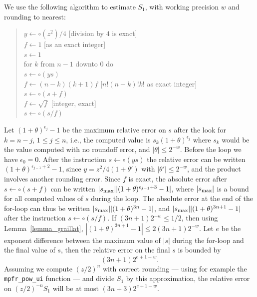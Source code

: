 \documentclass[12pt]{amsart}
\def\q{\hspace*{5mm}}
\begin{document}
We use the following algorithm to estimate $S_1$, with working precision $w$
and rounding to nearest:
\begin{quote}
$y \leftarrow \circ(z^2)/4$ [division by $4$ is exact] \\
$f \leftarrow 1$ [as an exact integer] \\
$s \leftarrow 1$ \\
for $k$ from $n-1$ downto $0$ do \\
\q $s \leftarrow \circ(y s)$ \\ %
\q $f \leftarrow (n-k) (k+1) f$ [$n! (n-k)! k!$ as exact integer] \\
\q $s \leftarrow \circ(s + f)$ \\
$f \leftarrow \sqrt{f}$ [integer, exact] \\
$s \leftarrow \circ(s / f)$
\end{quote}
Let $(1+\theta)^{\epsilon_j}-1$ be the maximum relative error on $s$ after
the look for $k=n-j$, $1 \leq j \leq n$, i.e., the computed value is
$s_k (1+\theta)^{\epsilon_j}$ where $s_k$ would be the value computed with
no roundoff error, and $|\theta| \leq 2^{-w}$.
Before the loop we have $\epsilon_0 = 0$. After the instruction
$s \leftarrow \circ(y s)$ the relative error can be written
$(1+\theta)^{\epsilon_{j-1}+2}-1$, since $y = z^2/4 (1+\theta')$ with
$|\theta'| \leq 2^{-w}$, and the product involves another
rounding error. Since $f$ is exact, the absolute error after
$s \leftarrow \circ(s + f)$ can be written $|s_{\rm max}|
|(1+\theta)^{\epsilon_{j-1}+3}-1|$, where $|s_{\rm max}|$ is a bound for all
computed values of $s$ during the loop.
The absolute error at the end of the for-loop can thus be written
$|s_{\rm max}| |(1+\theta)^{3n}-1|$, and $|s_{\rm max}| |(1+\theta)^{3n+1}-1|$
after the instruction $s \leftarrow \circ(s / f)$.
If $(3n+1)2^{-w} \leq 1/2$, then using Lemma~\ref{lemma_graillat},
$|(1+\theta)^{3n+1}-1| \leq 2(3n+1)2^{-w}$.
Let $e$ be the exponent difference between the maximum value of $|s|$ during
the for-loop and the final value of $s$, then the relative error on the final
$s$ is bounded by
\[ (3n+1) 2^{e+1-w}. \]
Assuming we compute $(z/2)^n$ with correct rounding --- using for example the
\texttt{mpfr\_pow\_ui} function --- and divide $S_1$ by this approximation,
the relative error on $(z/2)^{-n} S_1$ will be at most
$(3n+3) 2^{e+1-w}$.
\end{document}
